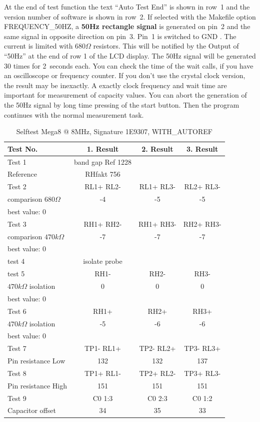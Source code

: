 At the end of test function the text ``Auto Test End''  is shown in row~1 and the version number of software is shown in row~2.
If selected with the Makefile option FREQUENCY\_50HZ, a {\bf 50Hz rectangle signal} is generated on pin~2 and 
the same signal in opposite direction on pin~3.
Pin~1 is switched to GND . The current is limited with \(680\Omega\) resistors.
This will be notified by the Output of ``50Hz'' at the end of row 1 of the LCD display.
The 50Hz signal will be generated 30 times for 2~seconds each.
You can check the time of the wait calls, if you have an oscilloscope or frequency counter.
If you don't use the crystal clock version, the result may be inexactly.
A exactly clock frequency and wait time are important for measurement of capacity values.
You can abort the generation of the 50Hz signal by long time pressing of the start button.
Then the program continues with the normal measurement task.


\begin{table}[H]
  \begin{center}
    \begin{tabular}{| l | c | c | c |}
    \hline
Test No. & 1. Result & 2. Result & 3. Result \\
    \hline
    \hline
Test 1 & band gap Ref  1228 &  & \\
Reference  & RHfakt 756 & &  \\
    \hline
Test 2 & RL1+ RL2- & RL1+ RL3- & RL2+ RL3- \\
comparison \(680\Omega\) & -4 & -5 & -5 \\
best value: 0 & & & \\
    \hline
Test 3 & RH1+ RH2- & RH1+ RH3- & RH2+ RH3- \\
comparison \(470k\Omega\) & -7 & -7 & -7 \\
best value: 0 & & & \\
    \hline
test 4 & isolate probe & & \\
    \hline
test 5 & RH1- &  RH2- & RH3- \\
\(470k\Omega\) isolation & 0 & 0 & 0 \\
best value: 0 & & & \\
    \hline
Test 6 & RH1+ & RH2+ & RH3+ \\
\(470k\Omega\) isolation & -5 & -6 & -6 \\
best value: 0 & & & \\
    \hline
Test 7 & TP1- RL1+ & TP2- RL2+ & TP3- RL3+ \\
Pin resistance Low & 132 & 132 & 137 \\
    \hline
Test 8 & TP1+ RL1- & TP2+ RL2- & TP3+ RL3- \\
Pin resistance High & 151 & 151 & 151 \\
    \hline
Test 9 & C0 1:3 & C0 2:3 & C0 1:2 \\
Capacitor offset & 34 & 35 & 33 \\
    \hline
    \end{tabular}
  \end{center}
  \caption{Selftest Mega8 @ 8MHz, Signature 1E9307, WITH\_AUTOREF}
  \label{tab:test_m8} 
\end{table}

